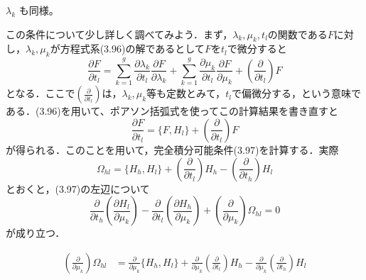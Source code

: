\documentclass[paper=a4, fontsize=11pt]{jlreq} %
\newenvironment{story}{%
  \begin{mdframed}[
    backgroundcolor=red!5, %
    linewidth=0pt,         %
    innertopmargin=10pt,   %
    innerbottommargin=10pt,
    innerrightmargin=10pt, %
    innerleftmargin=10pt
  ]%
}{%
  \end{mdframed}%
}
\theoremstyle{break}
\theoremstyle{qa}
\begin{document}
\vspace{1em}
\noindent
$\lambda_k$ も同様。

\begin{story}

この条件について少し詳しく調べてみよう．まず，$\lambda_k, \mu_k, t_l$の関数である$F$に対し，$\lambda_k, \mu_k$が方程式系(3.96)の解であるとして$F$を$t_l$で微分すると
\begin{equation*}
    \frac{\partial F}{\partial t_l} = \sum_{k=1}^g \frac{\partial \lambda_k}{\partial t_l} \frac{\partial F}{\partial \lambda_k} + \sum_{k=1}^g \frac{\partial \mu_k}{\partial t_l} \frac{\partial F}{\partial \mu_k} + \left( \frac{\partial}{\partial t_l} \right) F
\end{equation*}
となる．ここで$\left( \frac{\partial}{\partial t_l} \right)$は，$\lambda_k, \mu_k$等も定数とみて，$t_l$で偏微分する，という意味である．(3.96)を用いて、ポアソン括弧式を使ってこの計算結果を書き直すと
\begin{equation}
    \frac{\partial F}{\partial t_l} = \{F, H_l\} + \left( \frac{\partial}{\partial t_l} \right) F \tag{3.99}
\end{equation}
が得られる．このことを用いて，完全積分可能条件(3.97)を計算する．実際
\begin{equation}
    \Omega_{hl} = \{H_h, H_l\} + \left( \frac{\partial}{\partial t_l} \right) H_h - \left( \frac{\partial}{\partial t_h} \right) H_l \tag{3.100}
\end{equation}
とおくと，(3.97)の左辺について
\begin{equation*}
    \frac{\partial}{\partial t_h} \left( \frac{\partial H_l}{\partial \mu_k} \right) - \frac{\partial}{\partial t_l} \left( \frac{\partial H_h}{\partial \mu_k} \right) + \left( \frac{\partial}{\partial \mu_k} \right) \Omega_{hl} = 0
\end{equation*}
が成り立つ．
\end{story}
\begin{align*}
    \left( \frac{\partial}{\partial \mu_k} \right) \Omega_{hl} &= \frac{\partial}{\partial \mu_k} \{H_h, H_l\} + \frac{\partial}{\partial \mu_k} \left( \frac{\partial}{\partial t_l} \right) H_h - \frac{\partial}{\partial \mu_k} \left( \frac{\partial}{\partial t_h} \right) H_l
\end{align*}
\end{document}
